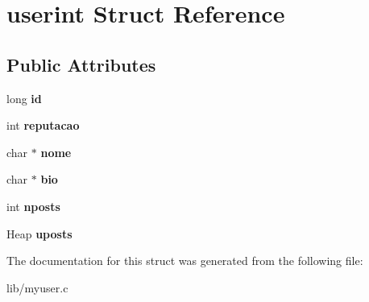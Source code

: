 \hypertarget{structuserint}{}\section{userint Struct Reference}
\label{structuserint}
\subsection*{Public Attributes}
\begin{DoxyCompactItemize}
\item 
long {\bfseries id}\hypertarget{structuserint_a9f6591f9188d79894b3796f07465e5a3}{}\label{structuserint_a9f6591f9188d79894b3796f07465e5a3}

\item 
int {\bfseries reputacao}\hypertarget{structuserint_ad2986212657c1baa0eebf868ea7f903e}{}\label{structuserint_ad2986212657c1baa0eebf868ea7f903e}

\item 
char $\ast$ {\bfseries nome}\hypertarget{structuserint_affeb699589d9ae14f1fb81b1de16d4e9}{}\label{structuserint_affeb699589d9ae14f1fb81b1de16d4e9}

\item 
char $\ast$ {\bfseries bio}\hypertarget{structuserint_aa158ae6b13b731934ec360041920b7c8}{}\label{structuserint_aa158ae6b13b731934ec360041920b7c8}

\item 
int {\bfseries nposts}\hypertarget{structuserint_a8d0715d0ee2ea8c94f7c3ddd61cfb970}{}\label{structuserint_a8d0715d0ee2ea8c94f7c3ddd61cfb970}

\item 
Heap {\bfseries uposts}\hypertarget{structuserint_a2577ab440db4fe368d0fca7a61cff158}{}\label{structuserint_a2577ab440db4fe368d0fca7a61cff158}

\end{DoxyCompactItemize}


The documentation for this struct was generated from the following file\+:\begin{DoxyCompactItemize}
\item 
lib/myuser.\+c\end{DoxyCompactItemize}
